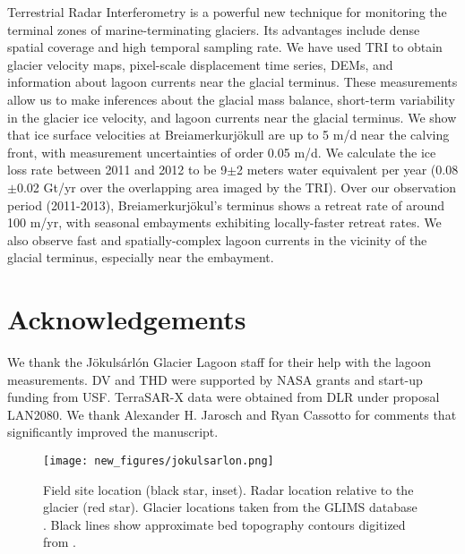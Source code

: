 \documentclass[review]{igs}
\begin{document}
Terrestrial Radar Interferometry is a powerful new technique for monitoring the terminal zones of marine-terminating glaciers. Its advantages include dense spatial coverage and high temporal sampling rate. We have used TRI to obtain glacier velocity maps, pixel-scale displacement time series, DEMs, and information about lagoon currents near the glacial terminus. These measurements allow us to make inferences about the glacial mass balance, short-term variability in the glacier ice velocity, and lagoon currents near the glacial terminus. We show that ice surface velocities at Brei{\dh}amerkurjökull are up to 5 m/d near the calving front, with measurement uncertainties of order 0.05 m/d. We calculate the ice loss rate between 2011 and 2012 to be 9$\pm$2 meters water equivalent per year (0.08$\pm$0.02 Gt/yr over the overlapping area imaged by the TRI). Over our observation period (2011-2013), Brei{\dh}amerkurjökul's terminus shows a retreat rate of around 100 m/yr, with seasonal embayments exhibiting locally-faster retreat rates. We also observe fast and spatially-complex lagoon currents in the vicinity of the glacial terminus, especially near the embayment.

\section{Acknowledgements}
We thank the Jökulsárlón Glacier Lagoon staff for their help with the lagoon measurements. DV and THD were supported by NASA grants and start-up funding from USF. TerraSAR-X data were obtained from DLR under proposal LAN2080. We thank Alexander H. Jarosch and Ryan Cassotto for comments that significantly improved the manuscript.

\newpage




\newpage

\begin{figure*}
\centering
\texttt{[image: new\_figures/jokulsarlon.png]}
\caption{Field site location (black star, inset). Radar location relative to the glacier (red star). Glacier locations taken from the GLIMS database \citep{sigurdhsson2005glims,raup2007glims}. Black lines show approximate bed topography contours digitized from \citet{bjornsson2001jokulsarlon}.}
\label{fig:sitelocation}
\end{figure*}
\end{document}
